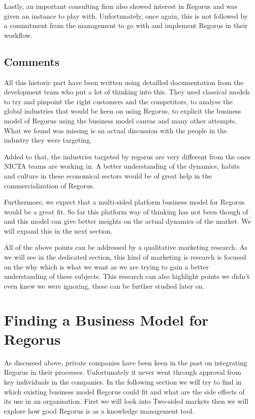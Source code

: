 \documentclass[10pt]{report}
\begin{document}
Lastly, an important consulting firm also showed interest in Regorus and was given an instance to play with. Unfortunately, once again, this is not followed by a commitment from the management to go with and implement Regorus in their workflow.

\subsection{Comments}

All this historic part have been written using detailled documentation from the development team who put a lot of thinking into this. They used classical models to try and pinpoint the right customers and the competitors, to analyse the global industries that would be keen on using Regorus, to explicit the business model of Regorus using the business model canvas and many other attempts. What we found was missing is an actual discussion with the people in the industry they were targeting.

Added to that, the industries targeted by regorus are very different from the ones NICTA teams are working in. A better understanding of the dynamics, habits and culture in these economical sectors would be of great help in the commercialization of Regorus.

Furthermore, we expect that a multi-sided platform business model for Regorus would be a great fit. So far this platform way of thinking has not been though of and this model can give better insights on the actual dynamics of the market. We will expand this in the next section.

All of the above points can be addressed by a qualitative marketing research. As we will see in the dedicated section, this kind of marketing is research is focused on the why which is what we want as we are trying to gain a better understanding of these subjects. This research can also highlight points we didn't even knew we were ignoring, these can be further studied later on.

\section{Finding a Business Model for Regorus}

As discussed above, private companies have been keen in the past on integrating Regorus in their processes. Unfortunately it never went through approval from key individuals in the companies. In the following section we will try to find in which existing business model Regorus could fit and what are the side effects of its use in an organisation. First we will look into Two-sided markets then we will explore how good Regorus is as a knowledge management tool.
\end{document}

